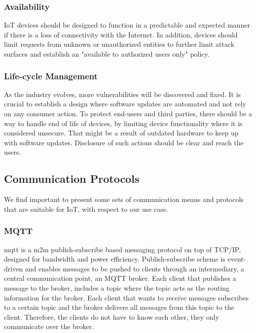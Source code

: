 \subsubsection{Availability}
IoT devices should be designed to function in a predictable and expected manner if there is a loss of connectivity with the Internet. In addition, devices should limit requests from unknown or unauthorized entities to further limit attack surfaces and establish an "available to authorized users only" policy.

\subsubsection{Life-cycle Management}
As the industry evolves, more vulnerabilities will be discovered and fixed. It is crucial to establish a design where software updates are automated and not rely on any consumer action. To protect end-users and third parties, there should be a way to handle end of life of devices, by limiting device functionality where it is considered unsecure. That might be a result of outdated hardware to keep up with software updates. Disclosure of such actions should be clear and reach the users.

\subsection{Communication Protocols}
We find important to present some sets of communication means and protocols that are suitable for IoT, with respect to our use case. 

\subsubsection{MQTT}
\acrfull{mqtt} is a \acrfull{m2m} publish-subscribe based messaging protocol on top of TCP/IP, designed for bandwidth and power efficiency. Publish-subscribe scheme is event-driven and enables messages to be pushed to clients through an intermediary, a central communication point, an MQTT broker. Each client that publishes a message to the broker, includes a topic where the topic acts as the routing information for the broker. Each client that wants to receive messages subscribes to a certain topic and the broker delivers all messages from this topic to the client. Therefore, the clients do not have to know each other, they only communicate over the broker.  

